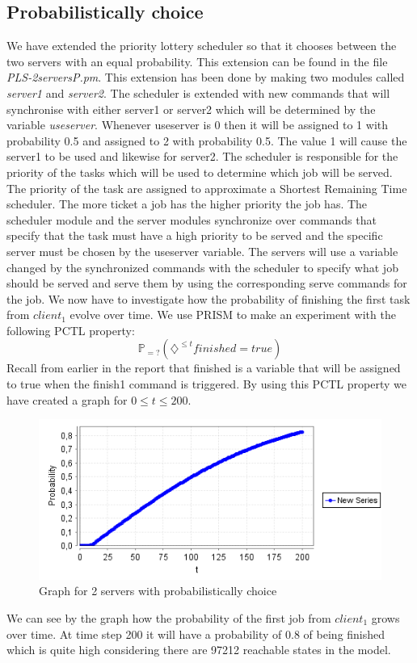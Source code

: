 \documentclass[12pt]{report}
\begin{document}
\subsection*{Probabilistically choice}
We have extended the priority lottery scheduler so that it chooses between the two servers with an equal probability. This extension can be found in the file \emph{PLS-2serversP.pm}. This extension has been done by making two modules called \emph{server1} and \emph{server2}. The scheduler is extended with new commands that will synchronise with either server1 or server2 which will be determined by the variable \emph{useserver}. Whenever useserver is 0 then it will be assigned to 1 with probability 0.5 and assigned to 2 with probability 0.5. The value 1 will cause the server1 to be used and likewise for server2. The scheduler is responsible for the priority of the tasks which will be used to determine which job will be served. The priority of the task are assigned to approximate a Shortest Remaining Time scheduler. The more ticket a job has the higher priority the job has. The scheduler module and the server modules synchronize over commands that specify that the task must have a high priority to be served and the specific server must be chosen by the useserver variable. The servers will use a variable changed by the synchronized commands with the scheduler to specify what job should be served and serve them by using the corresponding serve commands for the job. We now have to investigate how the probability of finishing the first task from $client_1$ evolve over time. We use PRISM to make an experiment with the following PCTL property:
$$\mathbb{P}_{=?}(\diamondsuit^{\leq t} finished=true)$$
Recall from earlier in the report that finished is a variable that will be assigned to true when the finish1 command is triggered. By using this PCTL property we have created a graph for $0 \leq t \leq 200$.
\begin{figure}[H]
	\begin{center}
		\includegraphics[scale=0.75]{../GFX/C1.png}
	\end{center}
	\caption{Graph for 2 servers with probabilistically choice}
\end{figure}
We can see by the graph how the probability of the first job from $client_1$ grows over time. At time step 200 it will have a probability of 0.8 of being finished which is quite high considering there are 97212 reachable states in the model.
\end{document}
